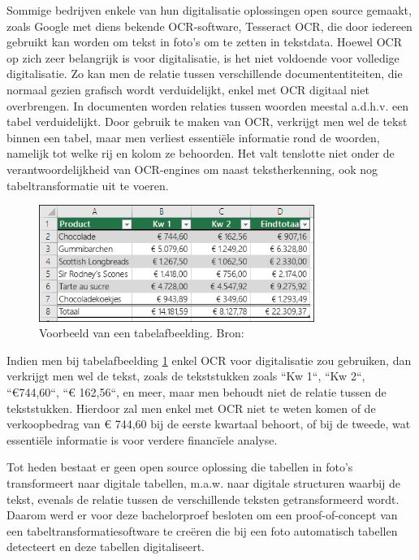 Sommige bedrijven enkele van hun digitalisatie oplossingen open source gemaakt, zoals Google met diens bekende OCR-software, Tesseract OCR, die door iedereen gebruikt kan worden om tekst in foto’s om te zetten in tekstdata. Hoewel \Gls{OCR} op zich zeer belangrijk is voor digitalisatie, is het niet voldoende voor volledige digitalisatie. Zo kan men de relatie tussen verschillende documententiteiten, die normaal gezien grafisch wordt verduidelijkt, enkel met \Gls{OCR} digitaal niet overbrengen. In documenten worden relaties tussen woorden meestal a.d.h.v. een tabel verduidelijkt. Door gebruik te maken van \Gls{OCR}, verkrijgt men wel de tekst binnen een tabel, maar men verliest essentiële informatie rond de woorden, namelijk tot welke rij en kolom ze behoorden. Het valt tenslotte niet onder de verantwoordelijkheid van OCR-engines om naast tekstherkenning, ook nog tabeltransformatie uit te voeren.

\begin{figure}[H]
    \centering
    \includegraphics[width=0.8\textwidth]{img/tabel_verduidelijking_relaties_woorden.png}
    \caption{Voorbeeld van een tabelafbeelding. Bron: \textcite{Microsoft2020}}
    \label{fig:tabel_verduidelijking_relaties_woorden}
\end{figure}

Indien men bij tabelafbeelding \ref{fig:tabel_verduidelijking_relaties_woorden} enkel \Gls{OCR} voor digitalisatie zou gebruiken, dan verkrijgt men wel de tekst, zoals de tekststukken zoals ``Kw 1``, ``Kw 2``, ``€744,60``, ``€ 162,56``, en meer, maar men behoudt niet de relatie tussen de tekststukken. Hierdoor zal men enkel met \Gls{OCR} niet te weten komen of de verkoopbedrag van € 744,60 bij de eerste kwartaal behoort, of bij de tweede, wat essentiële informatie is voor verdere financïele analyse.

Tot heden bestaat er geen open source oplossing die tabellen in foto's transformeert naar digitale tabellen, m.a.w. naar digitale structuren waarbij de tekst, evenals de relatie tussen de verschillende teksten getransformeerd wordt. Daarom werd er voor deze bachelorproef besloten om een proof-of-concept van een tabeltransformatiesoftware te creëren die bij een foto automatisch tabellen detecteert en deze tabellen digitaliseert.

